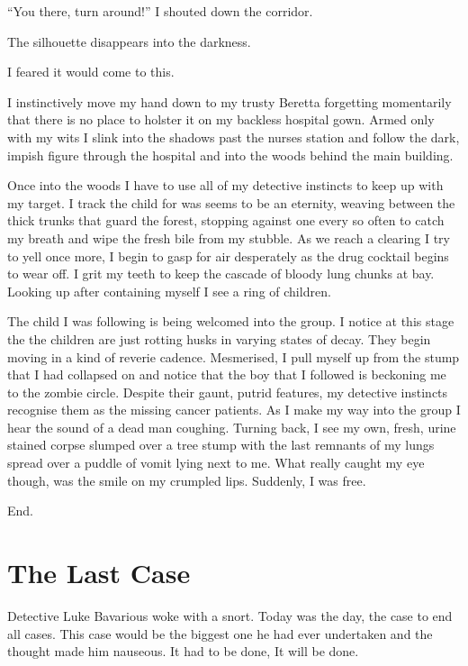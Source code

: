 ``You there, turn around!'' I shouted down the corridor.

The silhouette disappears into the darkness.

I feared it would come to this.

I instinctively move my hand down to my trusty Beretta forgetting
momentarily that there is no place to holster it on my backless
hospital gown. Armed only with my wits I slink into the shadows
past the nurses station and follow the dark, impish figure through
the hospital and into the woods behind the main building.

Once into the woods I have to use all of my detective instincts to
keep up with my target. I track the child for was seems to be an
eternity, weaving between the thick trunks that guard the forest,
stopping against one every so often to catch my breath and wipe the
fresh bile from my stubble. As we reach a clearing I try to yell
once more, I begin to gasp for air desperately as the drug cocktail
begins to wear off. I grit my teeth to keep the cascade of bloody
lung chunks at bay. Looking up after containing myself I see a ring
of children.

The child I was following is being welcomed into the group. I
notice at this stage the the children are just rotting husks in
varying states of decay. They begin moving in a kind of reverie
cadence. Mesmerised, I pull myself up from the stump that I had
collapsed on and notice that the boy that I followed is beckoning
me to the zombie circle. Despite their gaunt, putrid features, my
detective instincts recognise them as the missing cancer patients.
As I make my way into the group I hear the sound of a dead man
coughing. Turning back, I see my own, fresh, urine stained corpse
slumped over a tree stump with the last remnants of my lungs spread
over a puddle of vomit lying next to me. What really caught my eye
though, was the smile on my crumpled lips. Suddenly, I was
free.



End. 
 



\chapter{The Last Case}

Detective Luke Bavarious woke with a snort. Today was the day, the
case to end all cases. This case would be the biggest one he had
ever undertaken and the thought made him nauseous. It had to be
done, It will be done.



